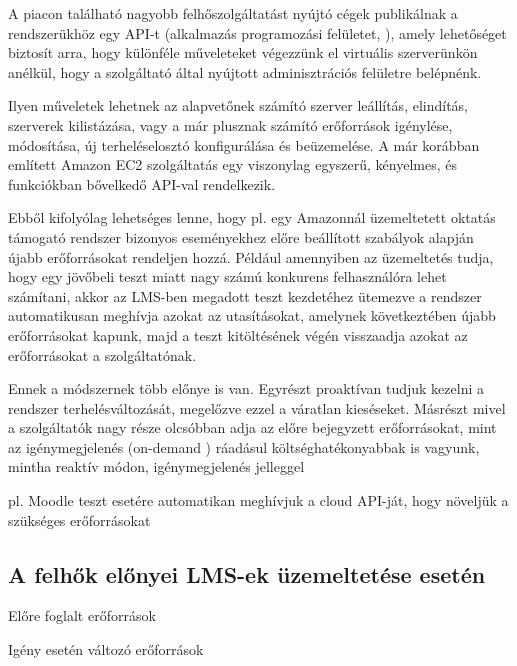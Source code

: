 A piacon található nagyobb felhőszolgáltatást nyújtó cégek publikálnak a rendszerükhöz egy API-t (alkalmazás programozási felületet, ), amely lehetőséget biztosít arra, hogy különféle műveleteket végezzünk el virtuális szerverünkön anélkül, hogy a szolgáltató által nyújtott adminisztrációs felületre belépnénk.

Ilyen műveletek lehetnek az alapvetőnek számító szerver leállítás, elindítás, szerverek kilistázása, vagy a már plusznak számító erőforrások igénylése, módosítása, új terheléselosztó konfigurálása és beüzemelése. A már korábban említett Amazon EC2 szolgáltatás egy viszonylag egyszerű, kényelmes, és funkciókban bővelkedő API-val rendelkezik.

Ebből kifolyólag lehetséges lenne, hogy pl. egy Amazonnál üzemeltetett oktatás támogató rendszer bizonyos eseményekhez előre beállított szabályok alapján újabb erőforrásokat rendeljen hozzá. Például amennyiben az üzemeltetés tudja, hogy egy jövőbeli teszt miatt nagy számú konkurens felhasználóra lehet számítani, akkor az LMS-ben megadott teszt kezdetéhez ütemezve a rendszer automatikusan meghívja azokat az utasításokat, amelynek következtében újabb erőforrásokat kapunk, majd a teszt kitöltésének végén visszaadja azokat az erőforrásokat a szolgáltatónak.

Ennek a módszernek több előnye is van. Egyrészt proaktívan tudjuk kezelni a rendszer terhelésváltozását, megelőzve ezzel a váratlan kieséseket. Másrészt mivel a szolgáltatók nagy része olcsóbban adja az előre bejegyzett erőforrásokat, mint az igénymegjelenés (on-demand )  ráadásul költséghatékonyabbak is vagyunk, mintha reaktív módon, igénymegjelenés jelleggel 


pl. Moodle teszt esetére automatikan meghívjuk a cloud API-ját, hogy növeljük a szükséges erőforrásokat

\subsection{A felhők előnyei LMS-ek üzemeltetése esetén}

Előre foglalt erőforrások
        
Igény esetén változó erőforrások

